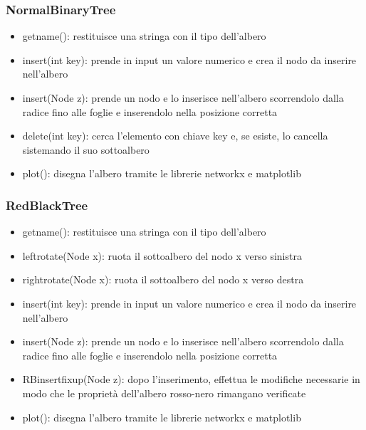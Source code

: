 \documentclass[a4paper,12pt]{article}
\begin{document}
    \subsubsection{NormalBinaryTree}
    \begin{itemize}
        \item get\textunderscore name(): restituisce una stringa con il tipo dell'albero
        \item insert(int key): prende in input un valore numerico e crea il nodo da inserire nell'albero
        \item \textunderscore insert(Node z): prende un nodo e lo inserisce nell'albero scorrendolo dalla radice fino
        alle foglie e inserendolo nella posizione corretta
        \item delete(int key): cerca l'elemento con chiave key e, se esiste, lo cancella sistemando il suo sottoalbero
        \item plot(): disegna l'albero tramite le librerie networkx e matplotlib
    \end{itemize}

    \subsubsection{RedBlackTree}
    \begin{itemize}
        \item get\textunderscore name(): restituisce una stringa con il tipo dell'albero
        \item left\textunderscore rotate(Node x): ruota il sottoalbero del nodo x verso sinistra
        \item right\textunderscore rotate(Node x): ruota il sottoalbero del nodo x verso destra
        \item insert(int key): prende in input un valore numerico e crea il nodo da inserire nell'albero
        \item \textunderscore insert(Node z): prende un nodo e lo inserisce nell'albero scorrendolo dalla radice fino
        alle foglie e inserendolo nella posizione corretta
        \item RB\textunderscore insert\textunderscore fixup(Node z): dopo l'inserimento, effettua le modifiche
        necessarie in modo che le proprietà dell'albero rosso-nero rimangano verificate
        \item plot(): disegna l'albero tramite le librerie networkx e matplotlib
    \end{itemize}
\end{document}
